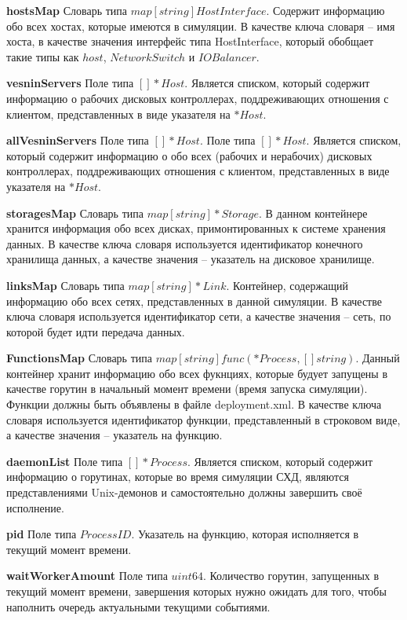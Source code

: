 \textbf{hostsMap}      
Словарь типа $map[string]HostInterface$. Содержит информацию обо всех хостах, которые имеются в симуляции. В качестве ключа словаря -- имя хоста, в качестве значения интерфейс типа HostInterface, который обобщает такие типы как $host$, $NetworkSwitch$ и $IOBalancer$.

\textbf{vesninServers}
Поле типа $[]*Host$. Является списком, который содержит информацию о рабочих дисковых контроллерах, поддреживающих отношения с клиентом, представленных в виде указателя на $*Host$.

\textbf{allVesninServers}
Поле типа $[]*Host$. Поле типа $[]*Host$. Является списком, который содержит информацию о обо всех (рабочих и нерабочих) дисковых контроллерах, поддреживающих отношения с клиентом, представленных в виде указателя на $*Host$.

\textbf{storagesMap}   
Словарь типа $map[string]*Storage$. В данном контейнере хранится информация обо всех дисках, примонтированных к системе хранения данных. В качестве ключа словаря используется идентификатор конечного хранилища данных, а качестве значения -- указатель на дисковое хранилище.

\textbf{linksMap}      
Словарь типа $map[string]*Link$. Контейнер, содержащий информацию обо всех сетях, представленных в данной симуляции.  В качестве ключа словаря используется идентификатор сети, а качестве значения -- сеть, по которой будет идти передача данных.

\textbf{FunctionsMap} 
Словарь типа $map[string]func(*Process, []string)$. Данный контейнер хранит информацию обо всех фукнциях, которые будует запущены в качестве горутин в начальный момент времени (время запуска симуляции). Функции должны быть объявлены в файле deployment.xml.  В качестве ключа словаря используется идентификатор функции, представленный в строковом виде, а качестве значения -- указатель на функцию.

\textbf{daemonList}  
Поле типа $[]*Process$. Является списком, который содержит информацию о горутинах, которые во время симуляции СХД, являются представлениями Unix-демонов и самостоятельно должны завершить своё исполнение.

\textbf{pid} 
Поле типа $ProcessID$. Указатель на функцию, которая исполняется в текущий момент времени.

\textbf{waitWorkerAmount} 
Поле типа $uint64$. Количество горутин, запущенных в текущий момент времени, завершения которых нужно ожидать для того, чтобы наполнить очередь актуальными текущими событиями. 

